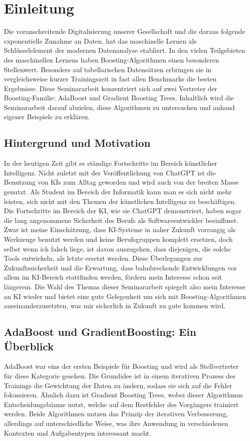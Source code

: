 \section{Einleitung}
Die voranschreitende Digitalisierung unserer Gesellschaft und die daraus folgende exponentielle Zunahme an Daten, hat das maschinelle Lernen als Schlüsselelement der modernen Datenanalyse etabliert. In den vielen Teilgebieten des maschinellen Lernens haben Boosting-Algorithmen einen besonderen Stellenwert. Besonders auf tabellarischen Datensätzen erbringen sie in vergleichsweise kurzer Trainingszeit in fast allen Benchmarks die besten Ergebnisse. Diese Seminararbeit konzentriert sich auf zwei Vertreter der Boosting-Familie: AdaBoost und Gradient Boosting Trees. Inhaltlich wird die Seminararbeit darauf abzielen, diese Algorithmen zu untersuchen und anhand eigener Beispiele zu erklären.

\subsection{Hintergrund und Motivation}
In der heutigen Zeit gibt es ständige Fortschritte im Bereich künstlicher Intelligenz. Nicht zuletzt mit der Veröffentlichung von ChatGPT ist die Benutzung von KIs zum Alltag geworden und wird auch von der breiten Masse genutzt. Als Student im Bereich der Informatik kann man es sich nicht mehr leisten, sich nicht mit den Themen der künstlichen Intelligenz zu beschäftigen. Die Fortschritte im Bereich der KI, wie sie ChatGPT demonstriert, haben sogar die lang angenommene Sicherheit des Berufs als Softwareentwickler beeinflusst. Zwar ist meine Einschätzung, dass KI-Systeme in naher Zukunft vorrangig als Werkzeuge benutzt werden und keine Berufsgruppen komplett ersetzen, doch selbst wenn ich falsch liege, ist davon auszugehen, dass diejenigen, die solche Tools entwickeln, als letzte ersetzt werden. Diese Überlegungen zur Zukunftssicherheit und die Erwartung, dass bahnbrechende Entwicklungen vor allem im KI-Bereich stattfinden werden, fördern mein Interesse schon seit längerem. Die Wahl des Themas dieser Seminararbeit spiegelt also mein Interesse an KI wieder und bietet eine gute Gelegenheit um sich mit Boosting-Algorithmen auseinanderzusetzten, was mir sicherlich in Zukunft zu gute kommen wird.

\subsection{AdaBoost und GradientBoosting: Ein Überblick}
AdaBoost war eins der ersten Beispiele für Boosting und wird als Stellvertreter für diese Kategorie gesehen. Die Grundidee ist in einem iterativen Prozess des Trainings die Gewichtung der Daten zu ändern, sodass sie sich auf die Fehler fokussieren. Ähnlich dazu ist Gradient Boosting Trees, wobei dieser Algorithmus Entscheidungsbäume nutzt, welche auf dem Restfehler des Vorgängers trainiert werden. Beide Algorithmen nutzen das Prinzip der iterativen Verbesserung, allerdings auf unterschiedliche Weise, was ihre Anwendung in verschiedenen Kontexten und Aufgabentypen interessant macht.

